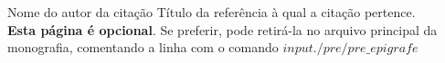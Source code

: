 {Nome do autor da citação}
{Título da referência à qual a citação pertence. \\ 
\textbf{Esta página é opcional}. Se preferir, pode retirá-la no arquivo principal da monografia, comentando a linha com o comando $input{./pre/pre\_epigrafe}$
}